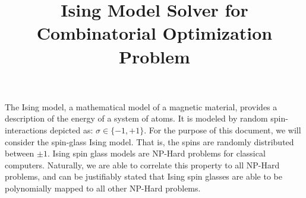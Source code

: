 \documentclass[conference]{IEEEtran}
\begin{document}
\title{Ising Model Solver for Combinatorial Optimization Problem}

\author{
\and
{}
}

\maketitle

\begin{comment}
\begin{abstract}
The integration of quantum computing in finance holds significant promise in showcasing the power of quantum supremacy. By utilizing the quantum approximate optimization algorithm (QAOA), we are able to perform the MaxCut operation on a connected graph of stocks to perform portfolio optimization. In QAOA, a quantum-classical loop consisting of a parameterized quantum circuit and classical optimizer solves a combinatorial problem. This poster shows how we were able to map stock market information to a graph that can undergo the operation of QAOA. Our implementation focuses on using Modern Portfolio Theory (MPT) to evaluate stocks, and aims to separate the portfolio to diversify the portfolio, minimizing risk and maximizing return.

We demonstrate the functionality of our implementation on a weighted 5-complete graph. This graph considers 5 stocks and minimizes the correlation between the two to create a diverse portfolio. We achieved a fidelity of 81\% using 8 repetitions on the simulated environment.
\end{abstract}
\end{comment}

The Ising model, a mathematical model of a magnetic material, provides a description of the energy of a system of atoms\cite{b1}. It is modeled by random spin-interactions depicted as: $\sigma \in \{-1, +1\}$. For the purpose of this document, we will consider the spin-glass Ising model. That is, the spins are randomly distributed between $\pm1$. Ising spin glass models are NP-Hard problems for classical computers. Naturally, we are able to correlate this property to all NP-Hard problems, and can be justifiably stated that Ising spin glasses are able to be polynomially mapped to all other NP-Hard problems\cite{b2}.
\end{document}
